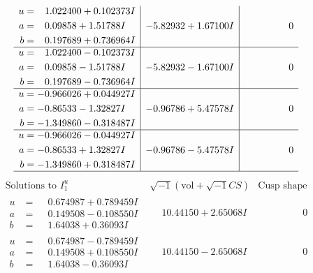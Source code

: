 \documentclass[1p]{elsarticle_modified}
\theoremstyle{definition}
\newcommand{\I}{\sqrt{-1}}
\begin{document}
$$\begin{array}{c|c|c}
\begin{aligned}
u &= \phantom{-}1.022400 + 0.102373 I \\
a &= \phantom{-}0.09858 + 1.51788 I \\
b &= \phantom{-}0.197689 + 0.736964 I\end{aligned}
 & -5.82932 + 1.67100 I & \phantom{-0.000000 } 0 \\ \hline\begin{aligned}
u &= \phantom{-}1.022400 - 0.102373 I \\
a &= \phantom{-}0.09858 - 1.51788 I \\
b &= \phantom{-}0.197689 - 0.736964 I\end{aligned}
 & -5.82932 - 1.67100 I & \phantom{-0.000000 } 0 \\ \hline\begin{aligned}
u &= -0.966026 + 0.044927 I \\
a &= -0.86533 - 1.32827 I \\
b &= -1.349860 - 0.318487 I\end{aligned}
 & -0.96786 + 5.47578 I & \phantom{-0.000000 } 0 \\ \hline\begin{aligned}
u &= -0.966026 - 0.044927 I \\
a &= -0.86533 + 1.32827 I \\
b &= -1.349860 + 0.318487 I\end{aligned}
 & -0.96786 - 5.47578 I & \phantom{-0.000000 } 0\\
 \hline 
 \end{array}$$\newpage$$\begin{array}{c|c|c}  
\text{Solutions to }I^u_{1}& \I (\text{vol} + \sqrt{-1}CS) & \text{Cusp shape}\\
 \hline 
\begin{aligned}
u &= \phantom{-}0.674987 + 0.789459 I \\
a &= \phantom{-}0.149508 - 0.108550 I \\
b &= \phantom{-}1.64038 + 0.36093 I\end{aligned}
 & \phantom{-}10.44150 + 2.65068 I & \phantom{-0.000000 } 0 \\ \hline\begin{aligned}
u &= \phantom{-}0.674987 - 0.789459 I \\
a &= \phantom{-}0.149508 + 0.108550 I \\
b &= \phantom{-}1.64038 - 0.36093 I\end{aligned}
 & \phantom{-}10.44150 - 2.65068 I & \phantom{-0.000000 } 0 \\ \hline\begin{aligned}

\end{aligned}
\end{array}$$
\end{document}
